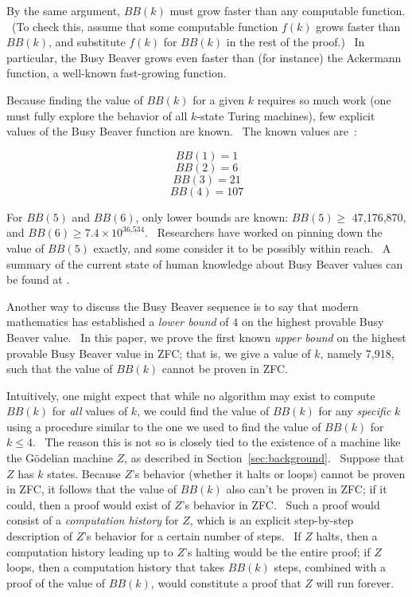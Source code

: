 \documentclass[11pt]{article}
\newcommand{\statenumcomma}{7,918, }
\begin{document}
By the same argument, $BB(k)$ must grow faster than any computable function. \ (To check this, assume that some computable function $f(k)$ grows faster than $BB(k)$, and substitute $f(k)$ for $BB(k)$ in the rest of the proof.) \ In particular, the Busy Beaver grows even faster than (for instance) the Ackermann function, a well-known fast-growing function.

Because finding the value of $BB(k)$ for a given $k$ requires so much work (one must fully explore the behavior of all $k$-state Turing machines), few explicit values of the Busy Beaver function are known. \ The known values are~\cite{bbfour,bbsmall}:

$$BB(1) = 1$$
$$BB(2) = 6$$
$$BB(3) = 21$$
$$BB(4) = 107$$

For $BB(5)$ and $BB(6)$, only lower bounds are known: $BB(5) \ge$ 47,176,870, and $BB(6) \ge 7.4 \times 10^{\textrm{36,534}}$. \ Researchers have worked on pinning down the value of $BB(5)$ exactly, and some consider it to be possibly within reach. \ A summary of the current state of human knowledge about Busy Beaver values can be found at \cite{bbvalues}.

Another way to discuss the Busy Beaver sequence is to say that modern mathematics has established a \emph{lower bound} of $4$ on the highest provable Busy Beaver value. \ In this paper, we prove the first known \emph{upper bound} on the highest provable Busy Beaver value in ZFC; that is, we give a value of $k$, namely \statenumcomma such that the value of $BB(k)$ cannot be proven in ZFC.

Intuitively, one might expect that while no algorithm may exist to compute $BB(k)$ for \emph{all} values of $k$, we could find the value of $BB(k)$ for any \emph{specific} $k$ using a procedure similar to the one we used to find the value of $BB(k)$ for $k \le 4$. \ The reason this is not so is closely tied to the existence of a machine like the G\"{o}delian machine $Z$, as described in Section~\ref{sec:background}. \ Suppose that $Z$ has $k$ states. Because $Z$'s behavior (whether it halts or loops) cannot be proven in ZFC, it follows that the value of $BB(k)$ also can't be proven in ZFC; if it could, then a proof would exist of $Z$'s behavior in ZFC. \ Such a proof would consist of a \emph{computation history} for $Z$, which is an explicit step-by-step description of $Z$'s behavior for a certain number of steps. \ If $Z$ halts, then a computation history leading up to $Z$'s halting would be the entire proof; if $Z$ loops, then a computation history that takes $BB(k)$ steps, combined with a proof of the value of $BB(k)$, would constitute a proof that $Z$ will run forever.
\end{document}
